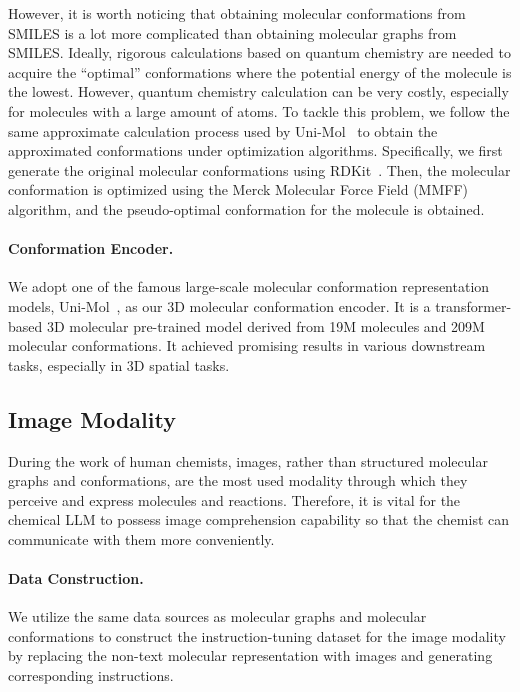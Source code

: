 However, it is worth noticing that obtaining molecular conformations from SMILES is a lot more complicated than obtaining molecular graphs from SMILES. Ideally, rigorous calculations based on quantum chemistry are needed to acquire the ``optimal'' conformations where the potential energy of the molecule is the lowest. However, quantum chemistry calculation can be very costly, especially for molecules with a large amount of atoms. To tackle this problem, we follow the same approximate calculation process used by Uni-Mol~\cite{zhou2023unimol} to obtain the approximated conformations under optimization algorithms. Specifically, we first generate the original molecular conformations using RDKit~\cite{rdkit}. Then, the molecular conformation is optimized using the Merck Molecular Force Field (MMFF)~\cite{halgren1996merck} algorithm, and the pseudo-optimal conformation for the molecule is obtained.

\paragraph{Conformation Encoder.}
We adopt one of the famous large-scale molecular conformation representation models, Uni-Mol~\cite{zhou2023unimol}, as our 3D molecular conformation encoder. It is a transformer-based 3D molecular pre-trained model derived from 19M molecules and 209M molecular conformations. It achieved promising results in various downstream tasks, especially in 3D spatial tasks.

\subsection{Image Modality}\label{sec:fig}

During the work of human chemists, images, rather than structured molecular graphs and conformations, are the most used modality through which they perceive and express molecules and reactions. Therefore, it is vital for the chemical LLM to possess image comprehension capability so that the chemist can communicate with them more conveniently.

\paragraph{Data Construction.} We utilize the same data sources as molecular graphs and molecular conformations to construct the instruction-tuning dataset for the image modality by replacing the non-text molecular representation with images and generating corresponding instructions.

